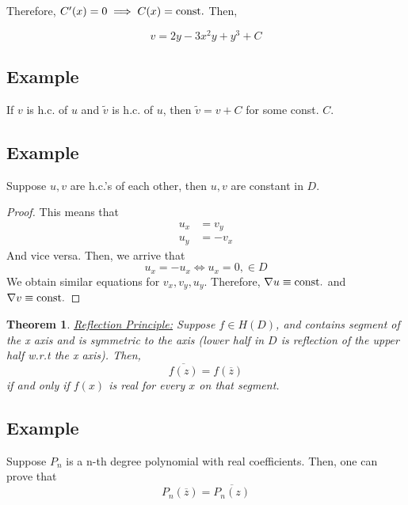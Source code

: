 \documentclass{article}
\newtheorem{theorem}{Theorem}[section]
\newtheorem{one minute paper}[theorem]{One Minute Paper}
\begin{document}
Therefore, $C'(x) = 0 \implies C(x) = \rm const.$ Then, 

\begin{equation}
    v = 2y - 3x^2y + y^3 + C
\end{equation}

\subsection*{Example}

If $v$ is h.c. of $u$ and $\tilde{v}$ is h.c. of $u$, then $\tilde{v} = v + C$ for some const. $C$.  

\subsection*{Example}

Suppose $u,v$ are h.c.'s of each other, then $u,v$ are constant in $D$. 

\begin{proof}
    This means that 
    \begin{align}
        u_x &= v_y \\
        u_y &= -v_x 
    \end{align}
    And vice versa. Then, we arrive that 
    \begin{equation}
        u_x = -u_x \iff u_x = 0, \in D
    \end{equation}
    We obtain similar equations for $v_x, v_y,u_y$. Therefore, $\nabla u \equiv \rm const.$ and $\nabla v \equiv \rm const.$  
\end{proof}

\begin{theorem}
    \underline{Reflection Principle:} Suppose $f \in H(D)$, and contains segment of the x axis and is symmetric to the axis (lower half in $D$ is reflection of the upper half w.r.t the x axis). Then, 
    \begin{equation}
        \overline{f(z)} = f(\overline{z})
    \end{equation}
    if and only if $f(x)$ is real for every $x$ on that segment. 
\end{theorem}

\subsection*{Example}

Suppose $P_n$ is a n-th degree polynomial with real coefficients. Then, one can prove that 
\begin{equation}
    P_n(\overline{z}) = \overline{P_n(z)}
\end{equation}
\end{document}
